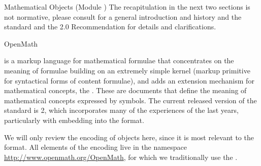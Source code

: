 \begin{tchapter}[id=mobj,short=Mathematical Objects]{Mathematical Objects (Module {})}
The recapitulation in the next two sections is not normative, please consult
{} for a general introduction and history and the {\openmath}
standard and the {\mathml} 2.0 Recommendation for details and
clarifications.


\begin{tsection}[id=openmath]{OpenMath}
  
  {\openmath} is a markup language for mathematical formulae that concentrates on the
  meaning of formulae building on an extremely simple kernel (markup primitive for
  syntactical forms of content formulae), and adds an extension mechanism for mathematical
  concepts, the {}.  These are
  {} documents that define the meaning of mathematical concepts
  expressed by {\openmath} symbols.  The current released version of the {\openmath}
  standard is {\openmath}2, which incorporates many of the experiences of the last years,
  particularly with embedding {\openmath} into the {\omdoc} format.

  We will only review the {\xml} encoding of {\openmath} objects here, since it is most
  relevant to the {\omdoc} format. All elements of the {\xml} encoding live in the
  {namespace} \url{http://www.openmath.org/OpenMath}, for
  which we traditionally use the {}
  {}.


\end{tsection}
\end{tchapter}
